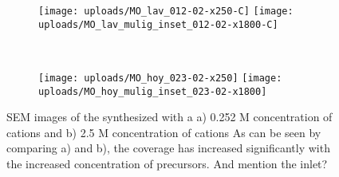 \begin{figure}
    \begin{subfigure}[t]{0.02\textwidth} \raisebox{6cm}{a)} \end{subfigure}
	\begin{subfigure}[b]{0.98\textwidth}
	\texttt{[image: uploads/MO\_lav\_012-02-x250-C]} \texttt{[image: uploads/MO\_lav\_mulig\_inset\_012-02-x1800-C]}
	\end{subfigure} \\ [-1em]
    \begin{subfigure}[t]{0.02\textwidth}
    \raisebox{6cm}{b)}
    \end{subfigure}
	\begin{subfigure}[b]{0.98\textwidth}
	\texttt{[image: uploads/MO\_hoy\_023-02-x250]} \texttt{[image: uploads/MO\_hoy\_mulig\_inset\_023-02-x1800]}
	\end{subfigure}
	\caption{SEM images of the synthesized  with a a) 0.252 M concentration of cations and b) 2.5 M concentration of cations  As can be seen by comparing a) and b), the coverage has increased significantly with the increased concentration of precursors. And mention the inlet?}
	\label{fig:MnO2_diff}
\end{figure}


\begin{table}[ht]
    \centering
    \caption{Table of different parameters and their effect on the synthesis.}
    \label{tab:parameters}
\end{table}